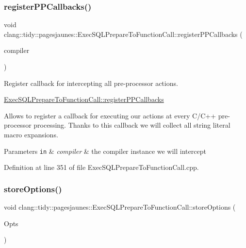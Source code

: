\subsubsection{\texorpdfstring{register\+P\+P\+Callbacks()}{registerPPCallbacks()}}
{\footnotesize\ttfamily void clang\+::tidy\+::pagesjaunes\+::\+Exec\+S\+Q\+L\+Prepare\+To\+Function\+Call\+::register\+P\+P\+Callbacks (\begin{DoxyParamCaption}\item[{Compiler\+Instance \&}]{compiler }\end{DoxyParamCaption})\hspace{0.3cm}{\ttfamily [override]}}



Register callback for intercepting all pre-\/processor actions. 

\hyperlink{classclang_1_1tidy_1_1pagesjaunes_1_1_exec_s_q_l_prepare_to_function_call_a0d6cac5b6419388f98ec398ba48db8c2}{Exec\+S\+Q\+L\+Prepare\+To\+Function\+Call\+::register\+P\+P\+Callbacks}

Allows to register a callback for executing our actions at every C/\+C++ pre-\/processor processing. Thanks to this callback we will collect all string literal macro expansions.


\begin{DoxyParams}[1]{Parameters}
\mbox{\tt in}  & {\em compiler} & the compiler instance we will intercept \\
\hline
\end{DoxyParams}


Definition at line 351 of file Exec\+S\+Q\+L\+Prepare\+To\+Function\+Call.\+cpp.

\mbox{\label{classclang_1_1tidy_1_1pagesjaunes_1_1_exec_s_q_l_prepare_to_function_call_adc3a382dec4397a4b66b1efa40cb6951}} 
\subsubsection{\texorpdfstring{store\+Options()}{storeOptions()}}
{\footnotesize\ttfamily void clang\+::tidy\+::pagesjaunes\+::\+Exec\+S\+Q\+L\+Prepare\+To\+Function\+Call\+::store\+Options (\begin{DoxyParamCaption}\item[{Clang\+Tidy\+Options\+::\+Option\+Map \&}]{Opts }\end{DoxyParamCaption})\hspace{0.3cm}{\ttfamily [override]}}



